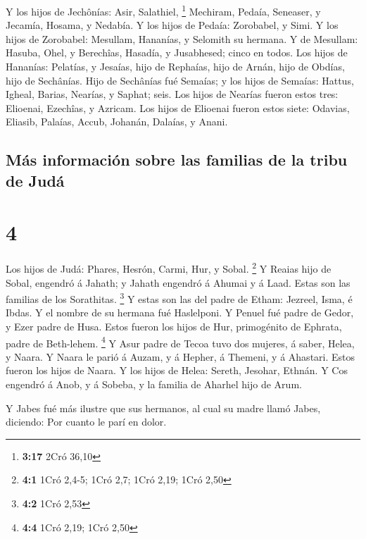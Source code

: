  Y los hijos de Jechônías: Asir, Salathiel, \footnote{\textbf{3:17}
  2Cró 36,10}  Mechiram, Pedaía, Seneaser, y Jecamía,
Hosama, y Nedabía.  Y los hijos de Pedaía: Zorobabel, y
Simi. Y los hijos de Zorobabel: Mesullam, Hananías, y Selomith su
hermana.  Y de Mesullam: Hasuba, Ohel, y Berechîas,
Hasadía, y Jusabhesed; cinco en todos.  Los hijos de
Hananías: Pelatías, y Jesaías, hijo de Rephaías, hijo de Arnán, hijo de
Obdías, hijo de Sechânías.  Hijo de Sechânías fué Semaías;
y los hijos de Semaías: Hattus, Igheal, Barias, Nearías, y Saphat; seis.
 Los hijos de Nearías fueron estos tres: Elioenai,
Ezechîas, y Azricam.  Los hijos de Elioenai fueron estos
siete: Odavias, Eliasib, Palaías, Accub, Johanán, Dalaías, y Anani.

\hypertarget{muxe1s-informaciuxf3n-sobre-las-familias-de-la-tribu-de-juduxe1}{%
\subsection{Más información sobre las familias de la tribu de
Judá}\label{muxe1s-informaciuxf3n-sobre-las-familias-de-la-tribu-de-juduxe1}}

\hypertarget{section-3}{%
\section{4}\label{section-3}}

 Los hijos de Judá: Phares, Hesrón, Carmi, Hur, y Sobal.
\footnote{\textbf{4:1} 1Cró 2,4-5; 1Cró 2,7; 1Cró 2,19; 1Cró 2,50}
 Y Reaias hijo de Sobal, engendró á Jahath; y Jahath
engendró á Ahumai y á Laad. Estas son las familias de los Sorathitas.
\footnote{\textbf{4:2} 1Cró 2,53}  Y estas son las del padre
de Etham: Jezreel, Isma, é Ibdas. Y el nombre de su hermana fué
Haslelponi.  Y Penuel fué padre de Gedor, y Ezer padre de
Husa. Estos fueron los hijos de Hur, primogénito de Ephrata, padre de
Beth-lehem. \footnote{\textbf{4:4} 1Cró 2,19; 1Cró 2,50}  Y
Asur padre de Tecoa tuvo dos mujeres, á saber, Helea, y Naara.
 Y Naara le parió á Auzam, y á Hepher, á Themeni, y á
Ahastari. Estos fueron los hijos de Naara.  Y los hijos de
Helea: Sereth, Jesohar, Ethnán.  Y Cos engendró á Anob, y á
Sobeba, y la familia de Aharhel hijo de Arum.

 Y Jabes fué más ilustre que sus hermanos, al cual su madre
llamó Jabes, diciendo: Por cuanto le parí en dolor.

